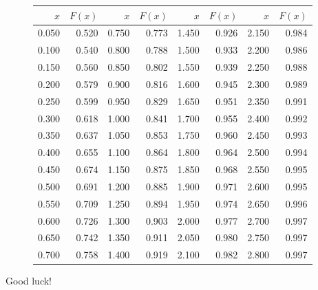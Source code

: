 \documentclass[addpoints]{exam} %
\begin{document}
\begin{figure}[b]
\begin{minipage}[b]{0.35\linewidth}
\begin{tikzpicture}
\end{tikzpicture}
\par\vspace{0pt}
  \end{minipage}%
  \begin{minipage}[b]{0.60\linewidth}
    \centering
\begin{tabular}{rr|rr|rr|rr}
  \hline
$x$ & $F(x)$ & $x$ & $F(x)$ & $x$ & $F(x)$ & $x$ & $F(x)$ \\
  \hline
0.050 & 0.520 & 0.750 & 0.773 & 1.450 & 0.926 & 2.150 & 0.984 \\
  0.100 & 0.540 & 0.800 & 0.788 & 1.500 & 0.933 & 2.200 & 0.986 \\
  0.150 & 0.560 & 0.850 & 0.802 & 1.550 & 0.939 & 2.250 & 0.988 \\
  0.200 & 0.579 & 0.900 & 0.816 & 1.600 & 0.945 & 2.300 & 0.989 \\
  0.250 & 0.599 & 0.950 & 0.829 & 1.650 & 0.951 & 2.350 & 0.991 \\
  0.300 & 0.618 & 1.000 & 0.841 & 1.700 & 0.955 & 2.400 & 0.992 \\
  0.350 & 0.637 & 1.050 & 0.853 & 1.750 & 0.960 & 2.450 & 0.993 \\
  0.400 & 0.655 & 1.100 & 0.864 & 1.800 & 0.964 & 2.500 & 0.994 \\
  0.450 & 0.674 & 1.150 & 0.875 & 1.850 & 0.968 & 2.550 & 0.995 \\
  0.500 & 0.691 & 1.200 & 0.885 & 1.900 & 0.971 & 2.600 & 0.995 \\
  0.550 & 0.709 & 1.250 & 0.894 & 1.950 & 0.974 & 2.650 & 0.996 \\
  0.600 & 0.726 & 1.300 & 0.903 & 2.000 & 0.977 & 2.700 & 0.997 \\
  0.650 & 0.742 & 1.350 & 0.911 & 2.050 & 0.980 & 2.750 & 0.997 \\
  0.700 & 0.758 & 1.400 & 0.919 & 2.100 & 0.982 & 2.800 & 0.997 \\
   \hline
\end{tabular}
\par\vspace{0pt}
\end{minipage}
\label{fig:test}
\end{figure}

\begin{flushright}
Good luck!
\end{flushright}
\end{document}
